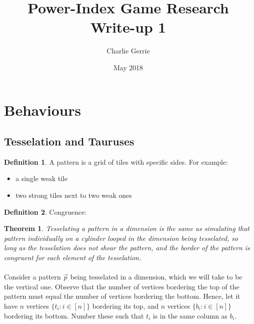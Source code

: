 \documentclass{article}
\title{Power-Index Game Research Write-up 1}
\date{May 2018}
\author{Charlie Gerrie}
\theoremstyle{plain}
\newtheorem{theorem}{Theorem}
\theoremstyle{definition}
\newtheorem{definition}{Definition}
\begin{document}
	\maketitle
	\newpage
	\tableofcontents
	\newpage
	\section{Behaviours}
		\subsection{Tesselation and Tauruses}
			\begin{definition}
				A pattern is a grid of tiles with specific sides. For example:
				\begin{itemize}
					\item
						a single weak tile
						\begin{figure}[h!]
						\end{figure}
					\item
						two strong tiles next to two weak ones
						\begin{figure}[h!]
						\end{figure}
				\end{itemize} 
			\end{definition}
			\begin{definition}
				Congruence:
			\end{definition}
			\begin{theorem}
				\label{iteration}
				Tesselating a pattern in a dimension is the same as simulating
				that pattern individually on a cylinder looped in the dimension
				being tesselated, so long as the tesselation does not shear the
				pattern, and the border of the pattern is congruent for each
				element of the tesselation.
			\end{theorem}
			\paragraph{}
			Consider a pattern $\vec{p}$ being tesselated in a dimension, which
			we will take to be the vertical one. Observe that the number of
			vertices bordering the top of the pattern must equal the number of
			vertices bordering the bottom. Hence, let it have $n$ vertices
			$\{t_i : i \in [n]\}$ bordering its top, and $n$ vertices
			$\{b_i : i \in [n]\} $ bordering its bottom. Number these such that
			$t_i$ is in the same column as $b_i$.
\end{document}
